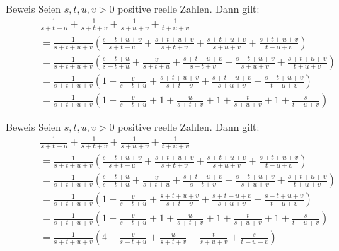 \documentclass[10pt]{beamer}
\begin{document}
\begin{frame}{Beweis}
    Seien \( s, t, u, v > 0 \) positive reelle Zahlen. Dann gilt:
    \begin{align*}
        & \frac{1}{s + t + u} + \frac{1}{s + t + v} + \frac{1}{s + u + v} + \frac{1}{t + u + v} \\
        & = \frac{1}{s + t + u + v} \left( \frac{s + t + u + v}{s + t + u} + \frac{s + t + u + v}{s + t + v} + \frac{s + t + u + v}{s + u + v} + \frac{s + t + u + v}{t + u + v} \right) \\
        & = \frac{1}{s + t + u + v} \left( \frac{s + t + u}{s + t + u} + \frac{v}{s + t + u} + \frac{s + t + u + v}{s + t + v} + \frac{s + t + u + v}{s + u + v} + \frac{s + t + u + v}{t + u + v} \right) \\
        & = \frac{1}{s + t + u + v} \left( 1 + \frac{v}{s + t + u} + \frac{s + t + u + v}{s + t + v} + \frac{s + t + u + v}{s + u + v} + \frac{s + t + u + v}{t + u + v} \right) \\
        & = \frac{1}{s + t + u + v} \left( 1 + \frac{v}{s + t + u} + 1 + \frac{u}{s + t + v} + 1 + \frac{t}{s + u + v} + 1 + \frac{s}{t + u + v} \right)
    \end{align*}
\end{frame}



\begin{frame}{Beweis}
    Seien \( s, t, u, v > 0 \) positive reelle Zahlen. Dann gilt:
    \begin{align*}
        & \frac{1}{s + t + u} + \frac{1}{s + t + v} + \frac{1}{s + u + v} + \frac{1}{t + u + v} \\
        & = \frac{1}{s + t + u + v} \left( \frac{s + t + u + v}{s + t + u} + \frac{s + t + u + v}{s + t + v} + \frac{s + t + u + v}{s + u + v} + \frac{s + t + u + v}{t + u + v} \right) \\
        & = \frac{1}{s + t + u + v} \left( \frac{s + t + u}{s + t + u} + \frac{v}{s + t + u} + \frac{s + t + u + v}{s + t + v} + \frac{s + t + u + v}{s + u + v} + \frac{s + t + u + v}{t + u + v} \right) \\
        & = \frac{1}{s + t + u + v} \left( 1 + \frac{v}{s + t + u} + \frac{s + t + u + v}{s + t + v} + \frac{s + t + u + v}{s + u + v} + \frac{s + t + u + v}{t + u + v} \right) \\
        & = \frac{1}{s + t + u + v} \left( 1 + \frac{v}{s + t + u} + 1 + \frac{u}{s + t + v} + 1 + \frac{t}{s + u + v} + 1 + \frac{s}{t + u + v} \right) \\
        & = \frac{1}{s + t + u + v} \left( 4 + \frac{v}{s + t + u} + \frac{u}{s + t + v} + \frac{t}{s + u + v} + \frac{s}{t + u + v} \right)
    \end{align*}
\end{frame}
\end{document}
